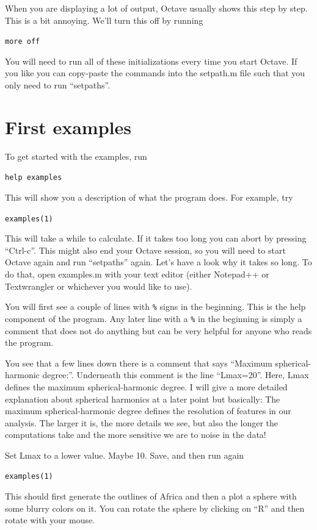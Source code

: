 \documentclass[11pt]{article}
\begin{document}
When you are displaying a lot of output, Octave usually shows this step by step. This is a bit annoying. We'll turn this off by running

\qquad \verb+more off+

You will need to run all of these initializations every time you start Octave. If you like you can copy-paste the commands into the setpath.m file such that you only need to run ``setpaths''.

\section{First examples}\label{examples}
To get started with the examples, run

\qquad \verb+help examples+

This will show you a description of what the program does. For example, try

\qquad \verb+examples(1)+

This will take a while to calculate. If it takes too long you can abort by pressing ``Ctrl-c''. This might also end your Octave session, so you will need to start Octave again and run ``setpaths'' again. Let's have a look why it takes so long. To do that, open examples.m with your text editor (either Notepad++ or Textwrangler or whichever you would like to use).

You will first see a couple of lines with \verb+%+ 
signs in the beginning. This is the help component of the program. Any later line with a \verb+%+
in the beginning is simply a comment that does not do anything but can be very helpful for anyone who reads the program.

You see that a few lines down there is a comment that says ``Maximum spherical-harmonic degree:''. Underneath this comment is the line ``Lmax=20''. Here, Lmax defines the maximum spherical-harmonic degree. I will give a more detailed explanation about spherical harmonics at a later point but basically: The maximum spherical-harmonic degree defines the resolution of features in our analysis. The larger it is, the more details we see, but also the longer the computations take and the more sensitive we are to noise in the data!

Set Lmax to a lower value. Maybe 10. Save, and then run again

\qquad \verb+examples(1)+

This should first generate the outlines of Africa and then a plot a sphere with some blurry colors on it. You can rotate the sphere by clicking on ``R'' and then rotate with your mouse.
\end{document}
